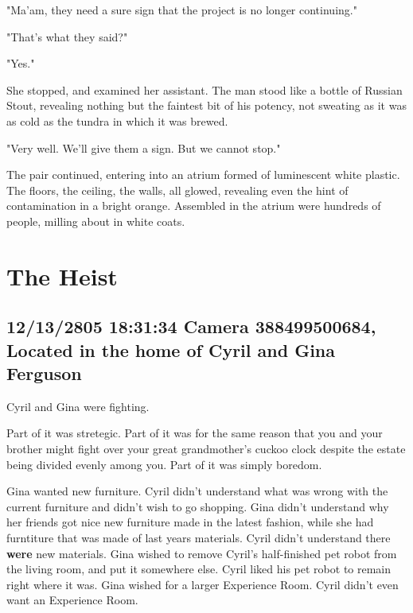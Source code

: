 \documentclass[12pt]{article}
\begin{document}
"Ma'am, they need a sure sign that the project is no longer continuing."

"That's what they said?"

"Yes."

She stopped, and examined her assistant. The man stood like a bottle of Russian Stout, revealing nothing but the faintest bit of his potency, not sweating as it was as cold as the tundra in which it was brewed.

"Very well. We'll give them a sign. But we cannot stop."

The pair continued, entering into an atrium formed of luminescent white plastic. The floors, the ceiling, the walls, all glowed, revealing even the hint of contamination in a bright orange. Assembled in the atrium were hundreds of people, milling about in white coats. 

\section*{The Heist}
\label{sec:org7140187}

\subsection*{12/13/2805 18:31:34 Camera 388499500684, Located in the home of Cyril and Gina Ferguson}
\label{sec:org8874e8d}

Cyril and Gina were fighting. 

Part of it was stretegic. Part of it was for the same reason that you and your brother might fight over your great grandmother's cuckoo clock despite the estate being divided evenly among you. Part of it was simply boredom.

Gina wanted new furniture. Cyril didn't understand what was wrong with the current furniture and didn't wish to go shopping. Gina didn't understand why her friends got nice new furniture made in the latest fashion, while she had furntiture that was made of last years materials. Cyril didn't understand there \textbf{were} new materials. Gina wished to remove Cyril's half-finished pet robot from the living room, and put it somewhere else. Cyril liked his pet robot to remain right where it was. Gina wished for a larger Experience Room. Cyril didn't even want an Experience Room.
\end{document}

